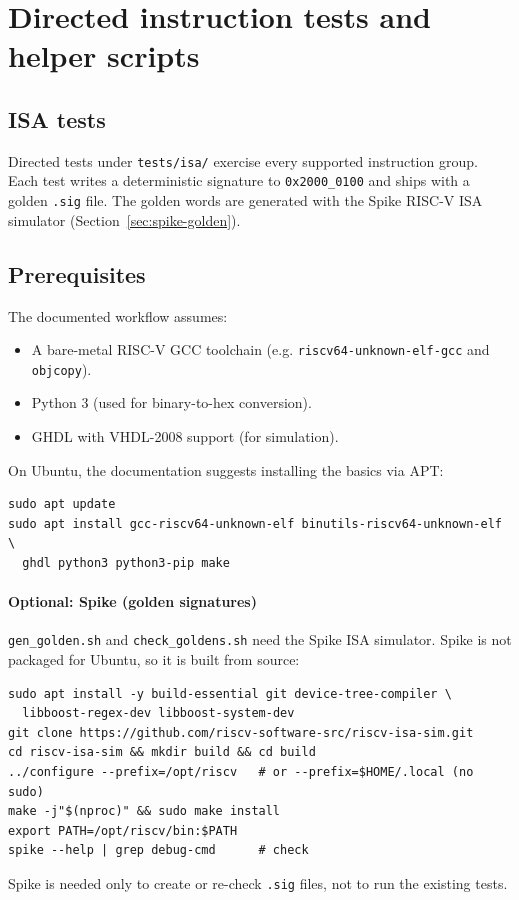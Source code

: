 \section{Directed instruction tests and helper scripts}

\subsection{ISA tests}
Directed tests under \texttt{tests/isa/} exercise every supported instruction
group. Each test writes a deterministic signature to \texttt{0x2000\_0100} and
ships with a golden \texttt{.sig} file. The golden words are generated with the
Spike RISC-V ISA simulator (Section~\ref{sec:spike-golden}).

\subsection{Prerequisites}
The documented workflow assumes:
\begin{itemize}[leftmargin=*]
  \item A bare-metal RISC-V GCC toolchain (e.g. \texttt{riscv64-unknown-elf-gcc} and \texttt{objcopy}).
  \item Python 3 (used for binary-to-hex conversion).
  \item GHDL with VHDL-2008 support (for simulation).
\end{itemize}

On Ubuntu, the documentation suggests installing the basics via APT:
\begin{lstlisting}[style=minrv]
sudo apt update
sudo apt install gcc-riscv64-unknown-elf binutils-riscv64-unknown-elf \
  ghdl python3 python3-pip make
\end{lstlisting}

\paragraph{Optional: Spike (golden signatures)}
\texttt{gen\_golden.sh} and \texttt{check\_goldens.sh} need the Spike ISA
simulator. Spike is not packaged for Ubuntu, so it is built from source:
\begin{lstlisting}[style=minrv]
sudo apt install -y build-essential git device-tree-compiler \
  libboost-regex-dev libboost-system-dev
git clone https://github.com/riscv-software-src/riscv-isa-sim.git
cd riscv-isa-sim && mkdir build && cd build
../configure --prefix=/opt/riscv   # or --prefix=$HOME/.local (no sudo)
make -j"$(nproc)" && sudo make install
export PATH=/opt/riscv/bin:$PATH
spike --help | grep debug-cmd      # check
\end{lstlisting}
Spike is needed only to create or re-check \texttt{.sig} files, not to run the
existing tests.

